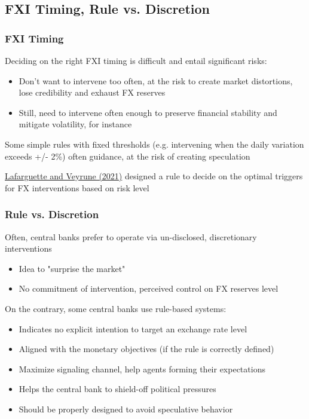 \documentclass{beamer}
\newenvironment{wideitemize}{\itemize\addtolength{\itemsep}{10pt}}{\enditemize}
\begin{document}
\subsection{FXI Timing, Rule vs. Discretion}
\begin{frame}
  \frametitle{FXI Timing}
  \begin{wideitemize}
  \item Deciding on the right FXI timing is difficult and entail significant risks:
    \begin{itemize}
    \item Don't want to intervene too often, at the risk to create market distortions, lose credibility and exhaust FX reserves
    \item Still, need to intervene often enough to preserve financial stability and mitigate volatility, for instance
    \end{itemize}
  \item Some simple rules with fixed thresholds (e.g. intervening when the daily variation exceeds +/- 2\%) often guidance, at the risk of creating speculation
  \item \href{https://www.imf.org/en/Publications/WP/Issues/2021/02/12/Foreign-Exchange-Intervention-Rules-for-Central-Banks-A-Risk-based-Framework-50081}{Lafarguette and Veyrune (2021)} designed a rule to decide on the optimal triggers for FX interventions based on risk level  
  \end{wideitemize}
\end{frame}


\begin{frame}
  \frametitle{Rule vs. Discretion}

  \begin{wideitemize}
  \item Often, central banks prefer to operate via un-disclosed, discretionary interventions
    \begin{itemize}
    \item Idea to "surprise the market"
    \item No commitment of intervention, perceived control on FX reserves level
    \end{itemize}
  \item On the contrary, some central banks use rule-based systems:
    \begin{itemize}
    \item Indicates no explicit intention to target an exchange rate level
    \item Aligned with the monetary objectives (if the rule is correctly defined)
    \item Maximize signaling channel, help agents forming their expectations
    \item Helps the central bank to shield-off political pressures
    \item Should be properly designed to avoid speculative behavior
    \end{itemize}
  \end{wideitemize}  
\end{frame}
\end{document}
